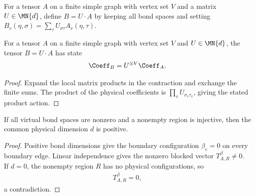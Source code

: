 \begin{definition}%
    \label{def:peps_physical_tensor_action}
    \leanok

    For a tensor $A$ on a finite simple graph with vertex set $V$ and a
    matrix $U\in\MN{d}$, define $B=U\cdot A$ by keeping all bond spaces
    and setting $B_v(\eta,\sigma)=\sum_\tau U_{\sigma\tau}A_v(\eta,\tau)$.
\end{definition}

\begin{lemma}%
    \label{thm:peps_state_physical_tensor_action}
    \leanok

    For a tensor $A$ on a finite simple graph with vertex set $V$ and
    $U\in\MN{d}$, the tensor $B=U\cdot A$ has state
    \begin{align}
        \Coeff_B=U^{\otimes V}\Coeff_A.
    \end{align}
\end{lemma}
\begin{proof}\leanok
    Expand the local matrix products in the contraction and exchange the
    finite sums. The product of the physical coefficients is
    $\prod_vU_{\sigma_v\tau_v}$, giving the stated product action.
\end{proof}

\begin{lemma}%
    \label{thm:peps_physical_dimension_pos_of_region}
    \leanok

    If all virtual bond spaces are nonzero and a nonempty region is
    injective, then the common physical dimension $d$ is positive.
\end{lemma}
\begin{proof}\leanok
    Positive bond dimensions give the boundary configuration $\beta_e=0$
    on every boundary edge. Linear independence gives the nonzero blocked
    vector $T_{A,R}^{\beta}\ne0$. If $d=0$, the nonempty region $R$ has
    no physical configurations, so
    \begin{align}
        T_{A,R}^{\beta}=0,
    \end{align}
    a contradiction.
\end{proof}

